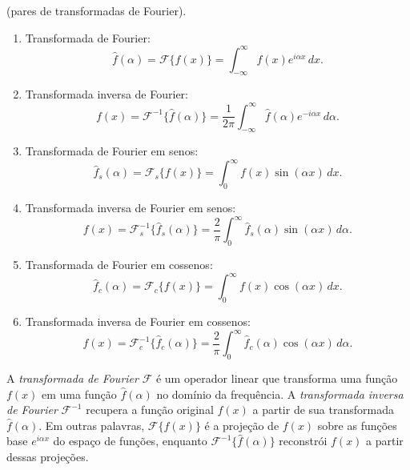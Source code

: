 \documentclass{article}
\begin{document}
\begin{defn} (pares de transformadas de Fourier).
    \begin{enumerate}
        \item[(i)] Transformada de Fourier: \begin{equation}
            \widehat{f}(\alpha) = \mathcal{F}\{f(x)\} = \int_{-\infty}^{\infty} f(x) e^{i\alpha x} \, dx.
        \end{equation}
        \item[] Transformada inversa de Fourier: \begin{equation}
            f(x) = \mathcal{F}^{-1}\{\widehat{f}(\alpha)\} = \frac{1}{2\pi} \int_{-\infty}^{\infty} \widehat{f}(\alpha) e^{-i\alpha x} \, d\alpha.
        \end{equation}
        \item[(ii)] Transformada de Fourier em senos: \begin{equation}
            \widehat{f}_s(\alpha) = \mathcal{F}_s\{f(x)\} = \int_{0}^{\infty} f(x) \sin(\alpha x) \, dx.
        \end{equation}
        \item[] Transformada inversa de Fourier em senos: \begin{equation}
            f(x) = \mathcal{F}_s^{-1}\{\widehat{f}_s(\alpha)\} = \frac{2}{\pi} \int_{0}^{\infty} \widehat{f}_s(\alpha) \sin(\alpha x) \, d\alpha.
        \end{equation}
        \item[(iii)] Transformada de Fourier em cossenos: \begin{equation}
            \widehat{f}_c(\alpha) = \mathcal{F}_c\{f(x)\} = \int_{0}^{\infty} f(x) \cos(\alpha x) \, dx.
        \end{equation}
        \item[] Transformada inversa de Fourier em cossenos: \begin{equation}
            f(x) = \mathcal{F}_c^{-1}\{\widehat{f}_c(\alpha)\} = \frac{2}{\pi} \int_{0}^{\infty} \widehat{f}_c(\alpha) \cos(\alpha x) \, d\alpha.
        \end{equation}
    \end{enumerate}
\end{defn}

\begin{rem}
    A \emph{transformada de Fourier} \(\mathcal{F}\) é um operador linear que transforma uma função \(f(x)\) em uma função \(\widehat{f}(\alpha)\) no domínio da frequência. A \emph{transformada inversa de Fourier} \(\mathcal{F}^{-1}\) recupera a função original \(f(x)\) a partir de sua transformada \(\widehat{f}(\alpha)\).
    Em outras palavras, \(\mathcal{F}\{f(x)\}\) é a projeção de \(f(x)\) sobre as funções base \(e^{i\alpha x}\) do espaço de funções, enquanto \(\mathcal{F}^{-1}\{\widehat{f}(\alpha)\}\) reconstrói \(f(x)\) a partir dessas projeções.
\end{rem}
\end{document}
